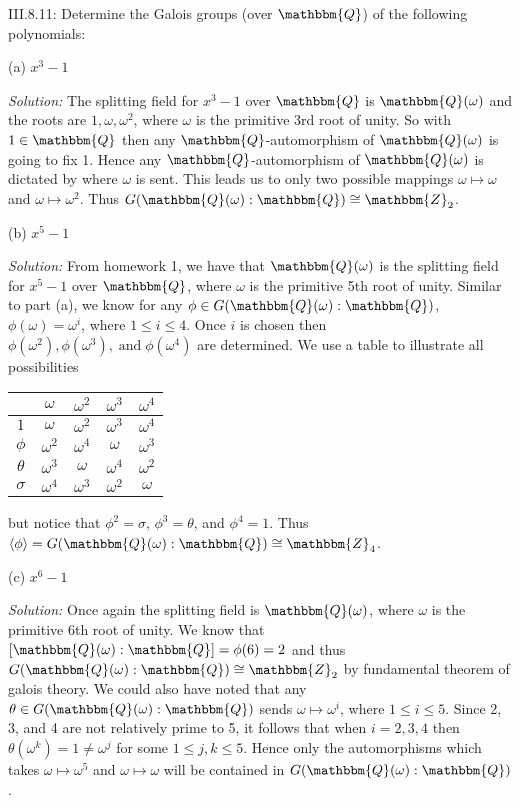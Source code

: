 \documentclass{letter}
\newcommand{\tmem}[1]{{\em #1\/}}
\newcommand{\tmop}[1]{\ensuremath{\operatorname{#1}}}
\begin{document}
III.8.11: Determine the Galois groups (over $\mathbbm{Q}$) of the following
polynomials:

(a) $x^3 - 1$

{\tmem{Solution:}} The splitting field for $x^3 - 1$ over $\mathbbm{Q}$ is
$\mathbbm{Q}(\omega)$ and the roots are $1, \omega, \omega^2$, where $\omega$
is the primitive 3rd root of unity. So with $1 \in \mathbbm{Q}$ then any
$\mathbbm{Q}$-automorphism of $\mathbbm{Q}(\omega)$ is going to fix 1. Hence
any $\mathbbm{Q}$-automorphism of $\mathbbm{Q}(\omega)$ is dictated by where
$\omega$ is sent. This leads us to only two possible mappings $\omega \mapsto
\omega$ and $\omega \mapsto \omega^2$. Thus $G (\mathbbm{Q}(\omega) :
\mathbbm{Q}) \cong \mathbbm{Z}_2$.

(b) $x^5 - 1$

{\tmem{Solution:}} From homework 1, we have that $\mathbbm{Q}(\omega)$ is the
splitting field for $x^5 - 1$ over $\mathbbm{Q}$, where $\omega$ is the
primitive 5th root of unity. Similar to part (a), we know for any $\phi \in G
(\mathbbm{Q}(\omega) : \mathbbm{Q})$, $\phi (\omega) = \omega^i$, where $1
\leq i \leq 4$. Once $i$ is chosen then $\phi (\omega^2), \phi (\omega^3),
\tmop{and} \phi (\omega^4)$ are determined. We use a table to illustrate all
possibilities

\begin{tabular}{|c|c|c|c|c|}
  & $\omega$ & $\omega^2$ & $\omega^3$ & $\omega^4$\\
  \hline
  $1$ & $\omega$ & $\omega^2$ & $\omega^3$ & $\omega^4$\\
  \hline
  $\phi$ & $\omega^2$ & $\omega^4$ & $\omega$ & $\omega^3$\\
  \hline
  $\theta$ & $\omega^3$ & $\omega$ & $\omega^4$ & $\omega^2$\\
  \hline
  $\sigma$ & $\omega^4$ & $\omega^3$ & $\omega^2$ & $\omega$\\
  \hline
\end{tabular} but notice that $\phi^2 = \sigma$, $\phi^3 = \theta$, and
$\phi^4 = 1$. Thus $\langle \phi \rangle = G (\mathbbm{Q}(\omega) :
\mathbbm{Q}) \cong \mathbbm{Z}_4$.

(c) $x^6 - 1$

{\tmem{Solution:}} Once again the splitting field is $\mathbbm{Q}(\omega)$,
where $\omega$ is the primitive 6th root of unity. We know that
$[\mathbbm{Q}(\omega) : \mathbbm{Q}] = \phi (6) = 2$ and thus $G
(\mathbbm{Q}(\omega) : \mathbbm{Q}) \cong \mathbbm{Z}_2$ by fundamental
theorem of galois theory. We could also have noted that any $\theta \in G
(\mathbbm{Q}(\omega) : \mathbbm{Q})$ sends $\omega \mapsto \omega^i$, where $1
\leq i \leq 5$. Since 2, 3, and 4 are not relatively prime to 5, it follows
that when $i = 2, 3, 4$ then $\theta (\omega^k) = 1 \neq \omega^j$ for some $1
\leq j, k \leq 5$. Hence only the automorphisms which takes $\omega \mapsto
\omega^5$ and $\omega \mapsto \omega$ will be contained in $\text{$G
(\mathbbm{Q}(\omega) : \mathbbm{Q})$}$.
\end{document}
